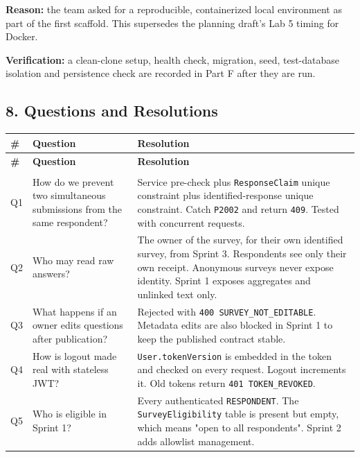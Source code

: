\documentclass[12pt,a4paper]{article}
\begin{document}
\textbf{Reason:} the team asked for a reproducible, containerized local environment as part of the first scaffold. This supersedes the planning draft's Lab 5 timing for Docker.

\textbf{Verification:} a clean-clone setup, health check, migration, seed, test-database isolation and persistence check are recorded in Part F after they are run.

\subsection*{8. Questions and Resolutions}
{\setlength{\tabcolsep}{3pt}\renewcommand{\arraystretch}{1.08}\small
\begin{longtable}{@{}>{\raggedright\arraybackslash}p{}>{\raggedright\arraybackslash}p{}>{\raggedright\arraybackslash}p{}@{}}
\toprule
\textbf{\#} & \textbf{Question} & \textbf{Resolution} \\
\midrule
\endfirsthead
\toprule
\textbf{\#} & \textbf{Question} & \textbf{Resolution} \\
\midrule
\endhead
\midrule
\multicolumn{3}{r}{\footnotesize\textit{Continued on next page}}\\
\endfoot
\bottomrule
\endlastfoot
Q1 & How do we prevent two simultaneous submissions from the same respondent? & Service pre-check plus \texttt{ResponseClaim} unique constraint plus identified-response unique constraint. Catch \texttt{P2002} and return \texttt{409}. Tested with concurrent requests. \\
Q2 & Who may read raw answers? & The owner of the survey, for their own identified survey, from Sprint 3. Respondents see only their own receipt. Anonymous surveys never expose identity. Sprint 1 exposes aggregates and unlinked text only. \\
Q3 & What happens if an owner edits questions after publication? & Rejected with \texttt{400 SURVEY\_NOT\_EDITABLE}. Metadata edits are also blocked in Sprint 1 to keep the published contract stable. \\
Q4 & How is logout made real with stateless JWT? & \texttt{User.tokenVersion} is embedded in the token and checked on every request. Logout increments it. Old tokens return \texttt{401 TOKEN\_REVOKED}. \\
Q5 & Who is eligible in Sprint 1? & Every authenticated \texttt{RESPONDENT}. The \texttt{SurveyEligibility} table is present but empty, which means "open to all respondents". Sprint 2 adds allowlist management. \\

\end{longtable}}
\end{document}
